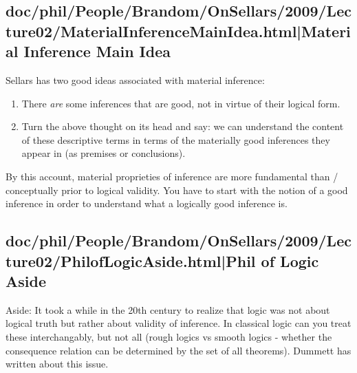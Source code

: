 \documentclass[12pt,a4paper]{report}
\begin{document}
\subsection{doc/phil/People/Brandom/OnSellars/2009/Lecture02/MaterialInferenceMainIdea.html|Material Inference Main Idea}

Sellars has two good ideas associated with material inference:
\begin{enumerate}
\item There \emph{are} some inferences that are good, not in virtue of their logical form.
\item Turn the above thought on its head and say: we can understand the content of these descriptive terms in terms of the materially good inferences they appear in (as premises or conclusions).
\end{enumerate}


By this account, material proprieties of inference are more fundamental than / conceptually prior to logical validity. You have to start with the notion of a good inference in order to understand what a logically good inference is.

\subsection{doc/phil/People/Brandom/OnSellars/2009/Lecture02/PhilofLogicAside.html|Phil of Logic Aside}

Aside: It took a while in the 20th century to realize that logic was not about
logical truth but rather about validity of inference. In classical logic can
you treat these interchangably, but not all (rough logics vs smooth logics -
whether the consequence relation can be determined by the set of all theorems).
Dummett has written about this issue.
\end{document}
